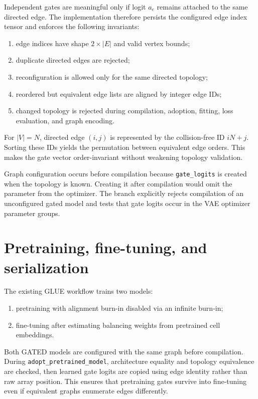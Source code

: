 \documentclass[11pt]{article}
\newcommand{\code}[1]{\texttt{#1}}
\begin{document}
Independent gates are meaningful only if logit $a_e$ remains attached to the
same directed edge.  The implementation therefore persists the configured
edge index tensor and enforces the following invariants:
\begin{enumerate}
  \item edge indices have shape $2\times |E|$ and valid vertex bounds;
  \item duplicate directed edges are rejected;
  \item reconfiguration is allowed only for the same directed topology;
  \item reordered but equivalent edge lists are aligned by integer edge IDs;
  \item changed topology is rejected during compilation, adoption, fitting,
        loss evaluation, and graph encoding.
\end{enumerate}
For $|V|=N$, directed edge $(i,j)$ is represented by the collision-free ID
$iN+j$.  Sorting these IDs yields the permutation between equivalent edge
orders.  This makes the gate vector order-invariant without weakening topology
validation.

Graph configuration occurs before compilation because \code{gate\_logits} is
created when the topology is known.  Creating it after compilation would omit
the parameter from the optimizer.  The branch explicitly rejects compilation
of an unconfigured gated model and tests that gate logits occur in the VAE
optimizer parameter groups.

\section{Pretraining, fine-tuning, and serialization}

The existing GLUE workflow trains two models:
\begin{enumerate}
  \item pretraining with alignment burn-in disabled via an infinite burn-in;
  \item fine-tuning after estimating balancing weights from pretrained cell
        embeddings.
\end{enumerate}
Both GATED models are configured with the same graph before compilation.
During \code{adopt\_pretrained\_model}, architecture equality and topology
equivalence are checked, then learned gate logits are copied using edge
identity rather than raw array position.  This ensures that pretraining gates
survive into fine-tuning even if equivalent graphs enumerate edges differently.
\end{document}
